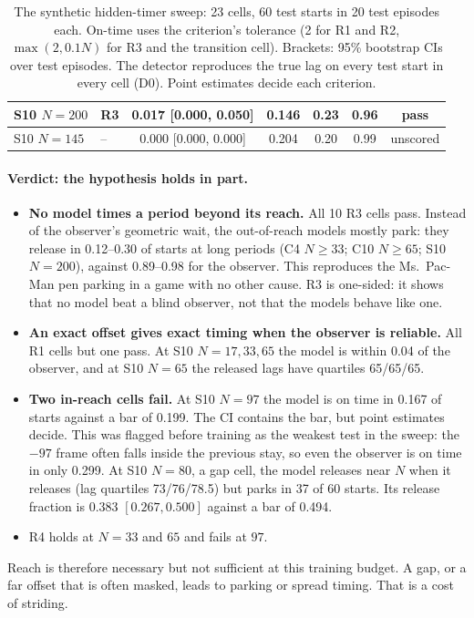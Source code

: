 \documentclass[11pt]{article}
\begin{document}
\begin{table}[h]
\begin{tabular}{llccccc}
S10 $N{=}200$ & R3 & 0.017 [0.000, 0.050] & 0.146 & 0.23 & 0.96 & pass \\
\midrule
S10 $N{=}145$ & -- & 0.000 [0.000, 0.000] & 0.204 & 0.20 & 0.99 & unscored \\
\bottomrule
\end{tabular}
\caption{The synthetic hidden-timer sweep: 23 cells, 60 test starts in 20 test episodes each. On-time uses the
criterion's tolerance (2 for R1 and R2, $\max(2,0.1N)$ for R3 and the transition cell). Brackets: 95\% bootstrap
CIs over test episodes. The detector reproduces the true lag on every test start in every cell (D0). Point
estimates decide each criterion.}
\label{tab:timer}
\end{table}

\paragraph{Verdict: the hypothesis holds in part.}
\begin{itemize}
\item \textbf{No model times a period beyond its reach.} All 10 R3 cells pass. Instead of the observer's geometric
wait, the out-of-reach models mostly park: they release in 0.12--0.30 of starts at long periods (C4 $N\ge33$; C10
$N\ge65$; S10 $N{=}200$), against 0.89--0.98 for the observer. This reproduces the Ms.~Pac-Man pen parking in a game
with no other cause. R3 is one-sided: it shows that no model beat a blind observer, not that the models behave like
one.
\item \textbf{An exact offset gives exact timing when the observer is reliable.} All R1 cells but one pass. At S10
$N{=}17,33,65$ the model is within 0.04 of the observer, and at S10 $N{=}65$ the released lags have quartiles
65/65/65.
\item \textbf{Two in-reach cells fail.} At S10 $N{=}97$ the model is on time in 0.167 of starts against a bar of
0.199. The CI contains the bar, but point estimates decide. This was flagged before training as the weakest test in
the sweep: the $-97$ frame often falls inside the previous stay, so even the observer is on time in only 0.299. At
S10 $N{=}80$, a gap cell, the model releases near $N$ when it releases (lag quartiles 73/76/78.5) but parks in 37 of
60 starts. Its release fraction is 0.383 $[0.267, 0.500]$ against a bar of 0.494.
\item R4 holds at $N{=}33$ and $65$ and fails at $97$.
\end{itemize}
Reach is therefore necessary but not sufficient at this training budget. A gap, or a far offset that is often
masked, leads to parking or spread timing. That is a cost of striding.
\end{document}
